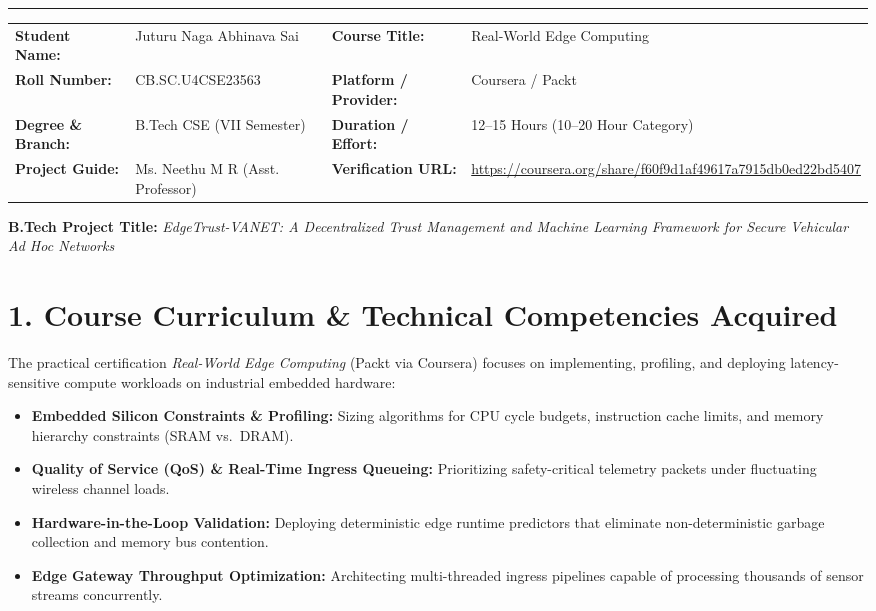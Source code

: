 \documentclass[10pt,a4paper]{article}
\begin{document}
\vspace{-4pt}
\hrule height 0.8pt
\vspace{4pt}

\noindent
\begin{tabularx}{\textwidth}{@{}l X l X@{}}
    \textbf{Student Name:} & Juturu Naga Abhinava Sai & \textbf{Course Title:} & Real-World Edge Computing \\
    \textbf{Roll Number:} & CB.SC.U4CSE23563 & \textbf{Platform / Provider:} & Coursera / Packt \\
    \textbf{Degree \& Branch:} & B.Tech CSE (VII Semester) & \textbf{Duration / Effort:} & 12--15 Hours (10--20 Hour Category) \\
    \textbf{Project Guide:} & Ms. Neethu M R (Asst. Professor) & \textbf{Verification URL:} & \url{https://coursera.org/share/f60f9d1af49617a7915db0ed22bd5407} \\
\end{tabularx}

\vspace{3pt}
\noindent
\textbf{B.Tech Project Title:} \textit{EdgeTrust-VANET: A Decentralized Trust Management and Machine Learning Framework for Secure Vehicular Ad Hoc Networks}

\vspace{2pt}
\section*{1. Course Curriculum \& Technical Competencies Acquired}
The practical certification \textit{Real-World Edge Computing} (Packt via Coursera) focuses on implementing, profiling, and deploying latency-sensitive compute workloads on industrial embedded hardware:
\begin{itemize}
    \item \textbf{Embedded Silicon Constraints \& Profiling:} Sizing algorithms for CPU cycle budgets, instruction cache limits, and memory hierarchy constraints (SRAM vs.\ DRAM).
    \item \textbf{Quality of Service (QoS) \& Real-Time Ingress Queueing:} Prioritizing safety-critical telemetry packets under fluctuating wireless channel loads.
    \item \textbf{Hardware-in-the-Loop Validation:} Deploying deterministic edge runtime predictors that eliminate non-deterministic garbage collection and memory bus contention.
    \item \textbf{Edge Gateway Throughput Optimization:} Architecting multi-threaded ingress pipelines capable of processing thousands of sensor streams concurrently.
\end{itemize}
\end{document}
